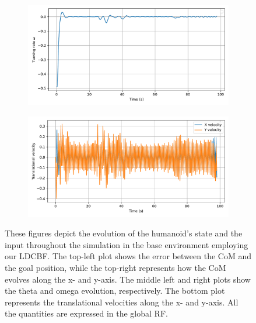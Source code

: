 \begin{figure}[H]
\begin{subfigure}{0.45\linewidth}
    \end{subfigure}
    \begin{subfigure}{0.45\linewidth}
        \centering
        \includegraphics[width=\linewidth]{figures/Simulations/sim1circles_delta/evolution_3.pdf}
    \end{subfigure}
    \hfill
    \begin{subfigure}{0.45\linewidth}
        \centering
        \includegraphics[width=\linewidth]{figures/Simulations/sim1circles_delta/evolution_1.pdf}
    \end{subfigure}
    \caption{These figures depict the evolution of the humanoid's state and the input throughout the simulation in the base environment employing our LDCBF. The top-left plot shows the error between the CoM and the goal position, while the top-right represents how the CoM evolves along the x- and y-axis. The middle left and right plots show the theta and omega evolution, respectively. The bottom plot represents the translational velocities along the x- and y-axis. All the quantities are expressed in the global RF.}
    \label{fig:sim1_delta_evol}
\end{figure}

